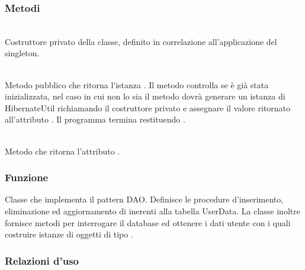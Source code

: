 \subsubsection*{Metodi}

\begin{description}
	\item{}\\
	Costruttore privato della classe, definito  in correlazione all'applicazione del  singleton.
	\item{}\\
	Metodo pubblico che ritorna l'istanza . Il metodo controlla se  è già stata inizializzata, nel caso in cui non lo sia il metodo dovrà generare un istanza di HibernateUtil richiamando il costruttore privato  e assegnare il valore ritornato all'attributo . Il programma termina restituendo .
	\item{}\\
	Metodo che ritorna l'attributo .
\end{description}


\subsubsection*{Funzione}
Classe che implementa il pattern DAO. Definisce le procedure d'inserimento, eliminazione ed aggiornamento di  inerenti alla tabella UserData. La classe inoltre fornisce metodi per interrogare il database ed ottenere i dati utente con i quali costruire istanze di oggetti di tipo .

\subsubsection*{Relazioni d'uso}

